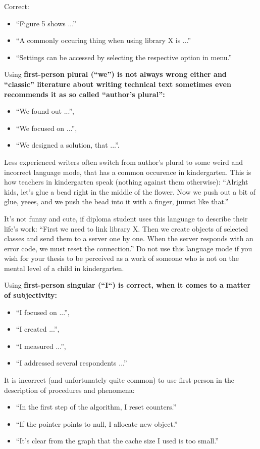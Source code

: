 {{Correct:
\begin{itemize}
  \item{``Figure 5 shows ...''}
  \item{``A commonly occuring thing when using library X is ...''}
  \item{``Settings can be accessed by selecting the respective option in menu.''}
\end{itemize}

Using \bf first-person plural \rm (``we'') is not always wrong either and ``classic'' literature about writing technical text sometimes even recommends it as so called ``author's plural'':
\begin{itemize}
  \item{``We found out ...''},
  \item{``We focused on ...''},
  \item{``We designed a solution, that ...''}.
\end{itemize}

Less experienced writers often switch from author's plural to some weird and incorrect language mode, that has a common occurence in kindergarten. This is how teachers in kindergarten speak (nothing against them otherwise): ``Alright kids, let's glue a bead right in the middle of the flower. Now we push out a bit of glue, yeees, and we push the bead into it with a finger, juuust like that.''

It's not funny and cute, if diploma student uses this language to describe their life's work: ``First we need to link library X. Then we create objects of selected classes and send them to a server one by one. When the server responds with an error code, we must reset the connection.'' Do not use this language mode if you wish for your thesis to be perceived as a work of someone who is not on the mental level of a child in kindergarten.

Using \bf first-person singular \rm (``I``) is correct, when it comes to a matter of subjectivity:
\begin{itemize}
  \item{``I focused on ...''},
  \item{``I created ...''},
  \item{``I measured ...''},
  \item{``I addressed several respondents ...''}
\end{itemize}

It is incorrect (and unfortunately quite common) to use first-person in the description of procedures and phenomena:
\begin{itemize}
  \item{``In the first step of the algorithm, I reset counters.''}
  \item{``If the pointer points to null, I allocate new object.''}
  \item{``It's clear from the graph that the cache size I used is too small.''}
\end{itemize}

}}
